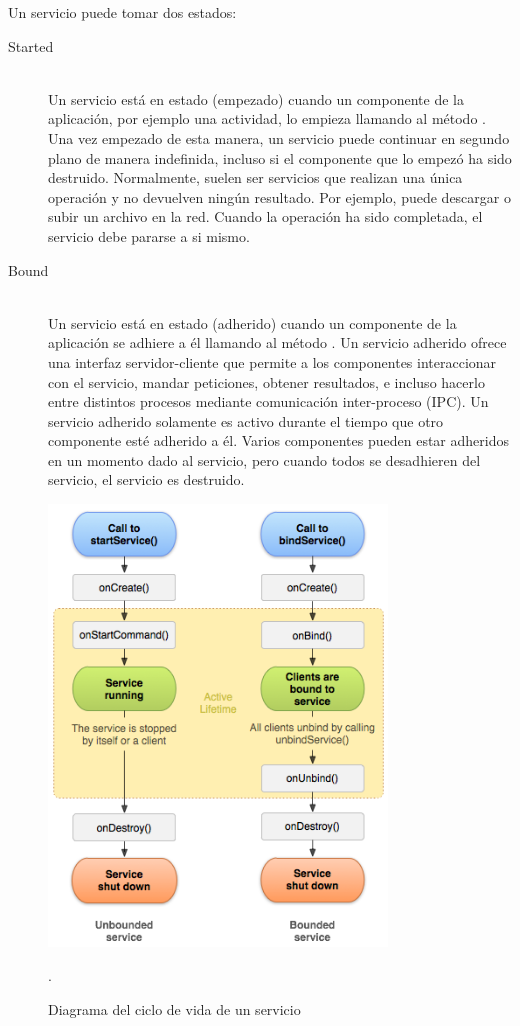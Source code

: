 Un servicio puede tomar dos estados:

\begin{description}
    \item[Started] \hfill \\
    Un servicio está en estado  (empezado) cuando un componente de la aplicación, por ejemplo una actividad, lo empieza llamando al método . Una vez empezado de esta manera, un servicio puede continuar en segundo plano de manera indefinida, incluso si el componente que lo empezó ha sido destruido. Normalmente, suelen ser servicios que realizan una única operación y no devuelven ningún resultado. Por ejemplo, puede descargar o subir un archivo en la red. Cuando la operación ha sido completada, el servicio debe pararse a si mismo.
    
    \item[Bound] \hfill \\
    Un servicio está en estado  (adherido) cuando un componente de la aplicación se adhiere a él llamando al método . Un servicio adherido ofrece una interfaz servidor-cliente que permite a los componentes interaccionar con el servicio, mandar peticiones, obtener resultados, e incluso hacerlo entre distintos procesos mediante comunicación inter-proceso (IPC). Un servicio adherido solamente es activo durante el tiempo que otro componente esté adherido a él. Varios componentes pueden estar adheridos en un momento dado al servicio, pero cuando todos se desadhieren del servicio, el servicio es destruido.

\end{description}

\begin{figure}[h] \centering
    \includegraphics[width=9cm]{graphs/service_lifecycle.png} \caption{Diagrama del ciclo de vida de un servicio \cite{androiddevguide}}.\label{fig:diagrama:ServiceLifecycle}
\end{figure}

